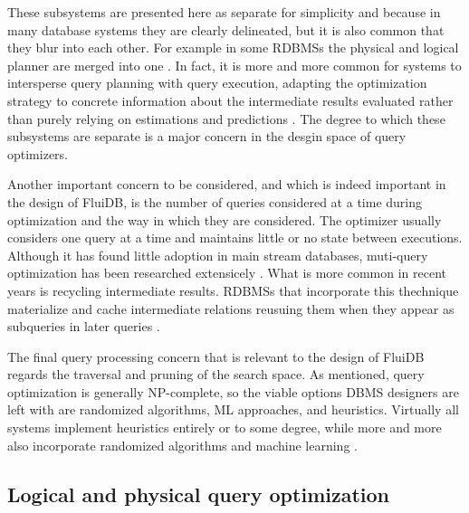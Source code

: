 These subsystems are presented here as separate for simplicity and
because in many database systems they are clearly delineated, but it is
also common that they blur into each other. For example in some RDBMSs
the physical and logical planner are merged into one
\cite{graefeCascadesFrameworkQuery1995,shankarQueryOptimizationMicrosoft2012,solimanOrcaModularQuery2014}. In
fact, it is more and more common for systems to intersperse query
planning with query execution, adapting the optimization strategy
\cite{graefeDynamicQueryEvaluation1989} to concrete information about
the intermediate results evaluated rather than purely relying on
estimations and predictions
\cite{dingPlanStitchHarnessing2018,chaudhuriPayasyougoFrameworkQuery2008,wuSamplingbasedQueryReoptimization2016,herodotouXplusSqltuningawareQuery2010}. The
degree to which these subsystems are separate is a major concern in
the desgin space of query optimizers.

Another important concern to be considered, and which is indeed
important in the design of FluiDB, is the number of queries considered
at a time during optimization and the way in which they are
considered. The optimizer usually considers one query at a time and
maintains little or no state between executions. Although it has found
little adoption in main stream databases, muti-query optimization has
been researched extensicely
\cite{michiardiCachebasedMultiqueryOptimization2021,wangMultiqueryOptimizationMapreduce2013,royEfficientExtensibleAlgorithms2000,rogersMultiqueryOptimization2017}. What
is more common in recent years is recycling intermediate
results. RDBMSs that incorporate this thechnique materialize and cache
intermediate relations reusuing them when they appear as subqueries in
later queries
\cite{perezHistoryawareQueryOptimization2014,nagelRecyclingPipelinedQuery2013,ivanovaArchitectureRecyclingIntermediates2010}.

The final query processing concern that is relevant to the design of
FluiDB regards the traversal and pruning of the search space. As
mentioned, query optimization is generally NP-complete, so the viable
options DBMS designers are left with are randomized algorithms, ML
approaches, and heuristics. Virtually all systems implement heuristics
entirely or to some degree, while more and more also incorporate
randomized algorithms \cite{chandeGeneticOptimizationJoin2011} and
machine learning
\cite{liMachineLearningDatabases2021,marcusNeoLearnedQuery2019}.

\subsection{Logical and physical query optimization}

